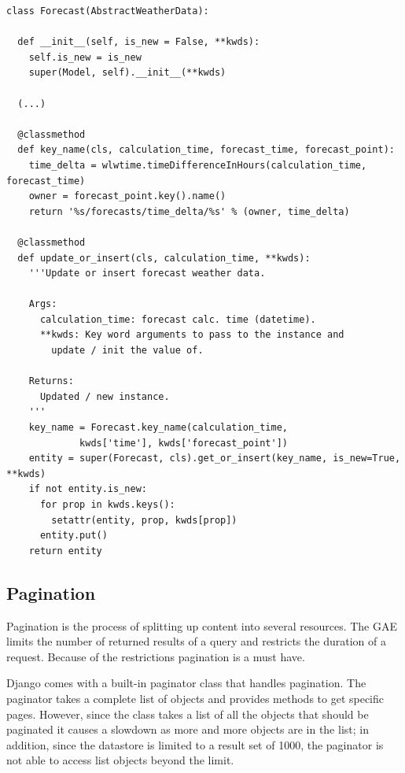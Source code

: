 \begin{lstlisting}[label=lst:unique_props_keyname,caption=Forecast with unique properties]
class Forecast(AbstractWeatherData):
  
  def __init__(self, is_new = False, **kwds):
    self.is_new = is_new
    super(Model, self).__init__(**kwds)

  (...)

  @classmethod
  def key_name(cls, calculation_time, forecast_time, forecast_point):
    time_delta = wlwtime.timeDifferenceInHours(calculation_time, forecast_time)
    owner = forecast_point.key().name()
    return '%s/forecasts/time_delta/%s' % (owner, time_delta)

  @classmethod
  def update_or_insert(cls, calculation_time, **kwds):
    '''Update or insert forecast weather data.
          
    Args:
      calculation_time: forecast calc. time (datetime).
      **kwds: Key word arguments to pass to the instance and 
        update / init the value of.
          
    Returns:
      Updated / new instance.
    '''
    key_name = Forecast.key_name(calculation_time, 
             kwds['time'], kwds['forecast_point'])
    entity = super(Forecast, cls).get_or_insert(key_name, is_new=True, **kwds)
    if not entity.is_new:
      for prop in kwds.keys():
        setattr(entity, prop, kwds[prop])
      entity.put()
    return entity
\end{lstlisting} 

\subsection{Pagination}\label{gae:pagination}
Pagination is the process of splitting up content into several resources. The GAE
limits the number of returned results of a query and restricts the duration of a
request. Because of the restrictions pagination is a must have.

Django comes with a built-in paginator class that handles pagination. The
paginator takes a complete list of objects and provides methods to get specific
pages. However, since the class takes a list of all the objects that should be
paginated it causes a slowdown as more and more objects are in the list; in
addition, since the datastore is limited to a result set of 1000, the paginator
is not able to access list objects beyond the limit.

